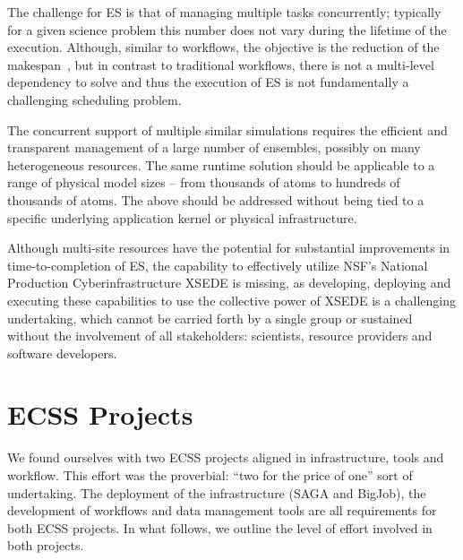\documentclass{sig-alternate}
\begin{document}


The challenge for ES is that of managing multiple tasks concurrently;
typically for a given science problem this number does not vary during
the lifetime of the execution. Although, similar to workflows, the
objective is the reduction of the makespan~, but in contrast to
traditional workflows, there is not a multi-level dependency to solve
and thus the execution of ES is not fundamentally a challenging
scheduling problem.

The concurrent support of multiple similar simulations requires the
efficient and transparent management of a large number of ensembles,
possibly on many heterogeneous resources. The same runtime solution
should be applicable to a range of physical model sizes -- from
thousands of atoms to hundreds of thousands of atoms.%
The above should be addressed without being tied to a specific
underlying application kernel or physical infrastructure. 
 
Although multi-site resources have the potential for substantial
improvements in time-to-completion of ES, the capability to
effectively utilize NSF's National Production Cyberinfrastructure
XSEDE is missing, as developing, deploying and executing these
capabilities to use the collective power of XSEDE is a challenging
undertaking, which cannot be carried forth by a single group or
sustained without the involvement of all stakeholders: scientists,
resource providers and software developers.

\section{ECSS Projects}

We found ourselves with two ECSS projects aligned in infrastructure, tools and
workflow. This effort was the proverbial: ``two for the price of one'' sort
of undertaking. The deployment of the infrastructure (SAGA and BigJob), the
development of workflows and data management tools are all requirements
for both ECSS projects. In what follows, we outline the level of effort involved
in both projects.
\end{document}
